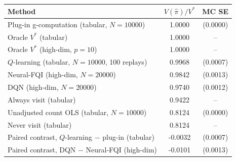 \begin{tabular}{lcc}
\toprule
Method & $V(\hat\pi) / V^*$ & MC SE \\
\midrule
Plug-in g-computation (tabular, $N=10000$) & 1.0000 & (0.0000) \\
Oracle $V^*$ (tabular) & 1.0000 & -- \\
Oracle $V^*$ (high-dim, $p=10$) & 1.0000 & -- \\
$Q$-learning (tabular, $N=10000$, 100 replays) & 0.9968 & (0.0007) \\
Neural-FQI (high-dim, $N=20000$) & 0.9842 & (0.0013) \\
DQN (high-dim, $N=20000$) & 0.9740 & (0.0012) \\
Always visit (tabular) & 0.9422 & -- \\
Unadjusted count OLS (tabular, $N=10000$) & 0.8124 & (0.0000) \\
Never visit (tabular) & 0.8124 & -- \\
\addlinespace
Paired contrast, $Q$-learning $-$ plug-in (tabular) & -0.0032 & (0.0007) \\
Paired contrast, DQN $-$ Neural-FQI (high-dim) & -0.0101 & (0.0013) \\
\bottomrule
\end{tabular}
